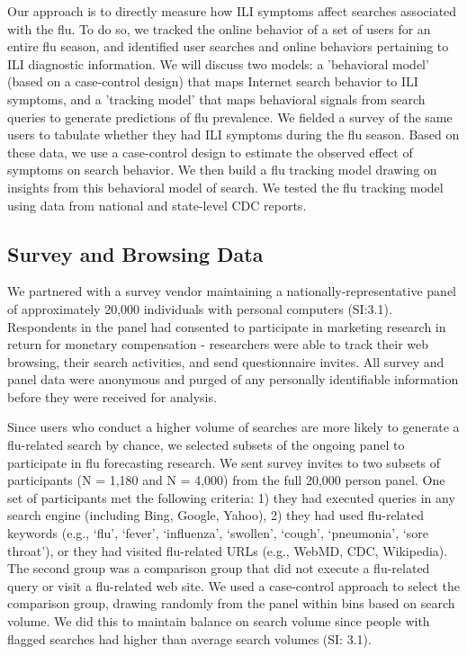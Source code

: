 \documentclass[fleqn,10pt]{wlscirep}
\begin{document}
Our approach is to directly measure how ILI symptoms affect searches associated with the flu. To do so, we tracked the online behavior of a set of users for an entire flu season, and identified user searches and online behaviors pertaining to ILI diagnostic information. We will discuss two models: a 'behavioral model' (based on a case-control design) that maps Internet search behavior to ILI symptoms, and a 'tracking model' that maps behavioral signals from search queries to generate predictions of flu prevalence. We fielded a survey of the same users to tabulate whether they had ILI symptoms during the flu season. Based on these data, we use a case-control design to estimate the observed effect of symptoms on search behavior. We then build a flu tracking model drawing on insights from this behavioral model of search. We tested the flu tracking model using data from national and state-level CDC reports.  

\subsection*{Survey and Browsing Data}

We partnered with a survey vendor maintaining a nationally-representative panel of approximately 20,000 individuals with personal computers (SI:3.1). Respondents in the panel had consented to participate in marketing research in return for monetary compensation - researchers were able to track their web browsing, their search activities, and send questionnaire invites. All survey and panel data were anonymous and purged of any personally identifiable information before they were received for analysis. 

Since users who conduct a higher volume of searches are more likely to generate a flu-related search by chance, we selected subsets of the ongoing panel to participate in flu forecasting research. We sent survey invites to two subsets of participants (N = 1,180 and N = 4,000) from the full 20,000 person panel. One set of participants met the following criteria: 1) they had executed queries in any search engine (including Bing, Google, Yahoo), 2) they had used flu-related keywords (e.g., `flu', `fever', `influenza', `swollen', `cough', `pneumonia', `sore throat'), or they had visited flu-related URLs (e.g., WebMD, CDC, Wikipedia). The second group was a comparison group that did not execute a flu-related query or visit a flu-related web site. We used a case-control approach to select the comparison group, drawing randomly from the panel within bins based on search volume. We did this to maintain balance on search volume since people with flagged searches had higher than average search volumes (SI: 3.1).
\end{document}
